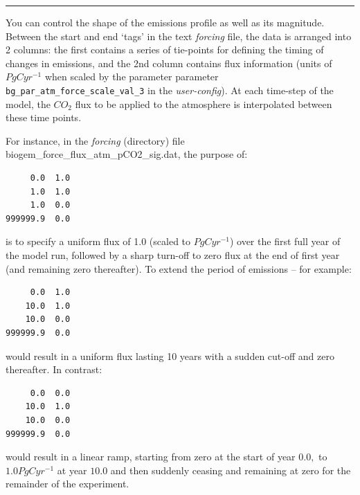 \vspace{1mm} \noindent\rule{4cm}{0.1mm} \vspace{2mm}

\newpage

\noindent You can control the shape of the emissions profile as well as its magnitude. Between the start and end ‘tags’ in the text \textit{forcing} file, the data is arranged into 2 columns: the first contains a series of tie-points for defining the timing of changes in emissions, and the 2nd column contains flux information (units of \(PgC yr^{-1}\) when scaled by the parameter parameter \texttt{bg\_par\_atm\_force\_scale\_val\_3} in the \textit{user-config}). At each time-step of the model, the \(CO_{2}\) flux to be applied to the atmosphere is interpolated between these time points.

\vspace{1pt}
For instance, in the \textit{forcing} (directory) file \textsf{\footnotesize biogem\_force\_flux\_atm\_pCO2\_sig.dat}, the purpose of:

\vspace{-2pt}\footnotesize\begin{verbatim}
     0.0  1.0
     1.0  1.0
     1.0  0.0
999999.9  0.0
\end{verbatim}\normalsize\vspace{-2pt}
is to specify a uniform flux of 1.0 (scaled to \(PgC yr^{-1}\)) over the first full year of the model run, followed by a sharp turn-off to zero flux at the end of first year (and remaining zero thereafter). To extend the period of emissions – for example:

\vspace{-2pt}\footnotesize\begin{verbatim}
     0.0  1.0
    10.0  1.0
    10.0  0.0
999999.9  0.0
\end{verbatim}\normalsize\vspace{-2pt}
would result in a uniform flux lasting 10 years with a sudden cut-off and zero thereafter. In contrast:

\vspace{-2pt}\footnotesize\begin{verbatim}
     0.0  0.0
    10.0  1.0
    10.0  0.0
999999.9  0.0
\end{verbatim}\normalsize\vspace{-2pt}
would result in a linear ramp, starting from zero at the start of year \(0.0,\) to \(1.0 PgC yr^{-1}\) at year \(10.0\) and then suddenly ceasing and remaining at zero for the remainder of the experiment.

